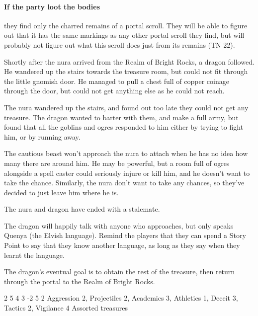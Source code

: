 \begin{multicols}{2}
\begin{exampletext}
\end{exampletext}

\paragraph{If the party loot the bodies}
they find only the charred remains of a portal scroll.
They will be able to figure out that it has the same markings as any other portal scroll they find, but will probably not figure out what this scroll does just from its remains (TN 22).


\begin{exampletext}

	Shortly after the nura arrived from the Realm of Bright Rocks, a dragon followed.
	He wandered up the stairs towards the treasure room, but could not fit through the little gnomish door.
	He managed to pull a chest full of copper coinage through the door, but could not get anything else as he could not reach.

	The nura wandered up the stairs, and found out too late they could not get any treasure.
	The dragon wanted to barter with them, and make a full army, but found that all the goblins and ogres responded to him either by trying to fight him, or by running away.

	The cautious beast won't approach the nura to attach when he has no idea how many there are around him.
	He may be powerful, but a room full of ogres alongside a spell caster could seriously injure or kill him, and he doesn't want to take the chance.
	Similarly, the nura don't want to take any chances, so they've decided to just leave him where he is.

	The nura and dragon have ended with a stalemate.

\end{exampletext}

The dragon will happily talk with anyone who approaches, but only speaks Quenya (the Elvish language).
Remind the players that they can spend a Story Point to say that they know another language, as long as they say when they learnt the language.

The dragon's eventual goal is to obtain the rest of the treasure, then return through the portal to the Realm of Bright Rocks.

{2}%
{5}%
{{4}%
{3}%
{-2}}%
{5}%
{2}%
{Aggression 2, Projectiles 2, Academics 3, Athletics 1, Deceit 3, Tactics 2, Vigilance 4}%
{Assorted treasures}%
{}


\end{multicols}
